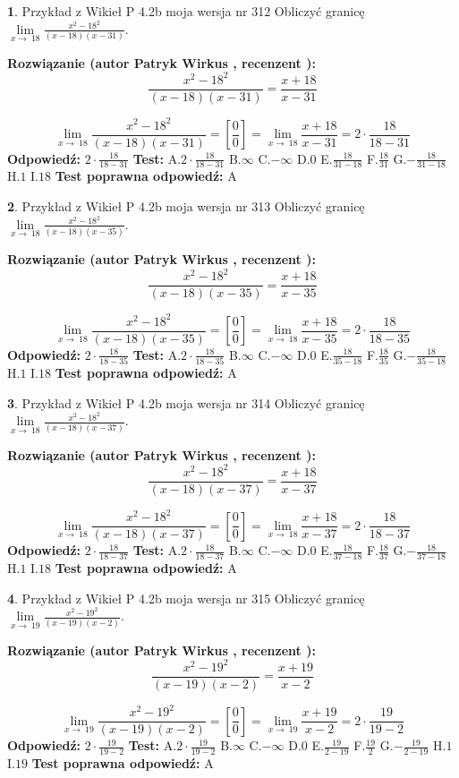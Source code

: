 \documentclass[12pt, a4paper]{article}
\theoremstyle{definition} %
\newtheorem{zad}{}
\newcommand{\zadStart}[1]{\begin{zad}#1\newline}
\newcommand{\zadStop}{\end{zad}}
\newcommand{\rozwStart}[2]{\noindent \textbf{Rozwiązanie (autor #1 , recenzent #2): }\newline}
\newcommand{\rozwStop}{\newline}
\newcommand{\odpStart}{\noindent \textbf{Odpowiedź:}\newline}
\newcommand{\odpStop}{\newline}
\newcommand{\testStart}{\noindent \textbf{Test:}\newline}
\newcommand{\testStop}{\newline}
\newcommand{\kluczStart}{\noindent \textbf{Test poprawna odpowiedź:}\newline}
\newcommand{\kluczStop}{\newline}
\begin{document}
\zadStart{Przykład z Wikieł P 4.2b moja wersja nr 312}
Obliczyć granicę $\lim\limits_{x\to\ 18}\frac{x^{2}-18^{2}}{(x-18)(x-31)}$.
\zadStop
\rozwStart{Patryk Wirkus}{}
$$\frac{x^{2}-18^{2}}{(x-18)(x-31)}=\frac{x+18}{x-31}$$

$$\lim\limits_{x\to\ 18}\frac{x^{2}-18^{2}}{(x-18)(x-31)}=[\frac{0}{0}]=\lim\limits_{x\to\ 18}\frac{x+18}{x-31}=2 \cdot \frac{18}{18-31}$$
\rozwStop
\odpStart
$2 \cdot \frac{18}{18-31}$
\odpStop
\testStart
A.$2 \cdot \frac{18}{18-31}$
B.$\infty$
C.$-\infty$
D.$0$
E.$\frac{18}{31-18}$
F.$\frac{18}{31}$
G.$-\frac{18}{31-18}$
H.$1$
I.$18$
\testStop
\kluczStart
A
\kluczStop



\zadStart{Przykład z Wikieł P 4.2b moja wersja nr 313}
Obliczyć granicę $\lim\limits_{x\to\ 18}\frac{x^{2}-18^{2}}{(x-18)(x-35)}$.
\zadStop
\rozwStart{Patryk Wirkus}{}
$$\frac{x^{2}-18^{2}}{(x-18)(x-35)}=\frac{x+18}{x-35}$$

$$\lim\limits_{x\to\ 18}\frac{x^{2}-18^{2}}{(x-18)(x-35)}=[\frac{0}{0}]=\lim\limits_{x\to\ 18}\frac{x+18}{x-35}=2 \cdot \frac{18}{18-35}$$
\rozwStop
\odpStart
$2 \cdot \frac{18}{18-35}$
\odpStop
\testStart
A.$2 \cdot \frac{18}{18-35}$
B.$\infty$
C.$-\infty$
D.$0$
E.$\frac{18}{35-18}$
F.$\frac{18}{35}$
G.$-\frac{18}{35-18}$
H.$1$
I.$18$
\testStop
\kluczStart
A
\kluczStop



\zadStart{Przykład z Wikieł P 4.2b moja wersja nr 314}
Obliczyć granicę $\lim\limits_{x\to\ 18}\frac{x^{2}-18^{2}}{(x-18)(x-37)}$.
\zadStop
\rozwStart{Patryk Wirkus}{}
$$\frac{x^{2}-18^{2}}{(x-18)(x-37)}=\frac{x+18}{x-37}$$

$$\lim\limits_{x\to\ 18}\frac{x^{2}-18^{2}}{(x-18)(x-37)}=[\frac{0}{0}]=\lim\limits_{x\to\ 18}\frac{x+18}{x-37}=2 \cdot \frac{18}{18-37}$$
\rozwStop
\odpStart
$2 \cdot \frac{18}{18-37}$
\odpStop
\testStart
A.$2 \cdot \frac{18}{18-37}$
B.$\infty$
C.$-\infty$
D.$0$
E.$\frac{18}{37-18}$
F.$\frac{18}{37}$
G.$-\frac{18}{37-18}$
H.$1$
I.$18$
\testStop
\kluczStart
A
\kluczStop



\zadStart{Przykład z Wikieł P 4.2b moja wersja nr 315}
Obliczyć granicę $\lim\limits_{x\to\ 19}\frac{x^{2}-19^{2}}{(x-19)(x-2)}$.
\zadStop
\rozwStart{Patryk Wirkus}{}
$$\frac{x^{2}-19^{2}}{(x-19)(x-2)}=\frac{x+19}{x-2}$$

$$\lim\limits_{x\to\ 19}\frac{x^{2}-19^{2}}{(x-19)(x-2)}=[\frac{0}{0}]=\lim\limits_{x\to\ 19}\frac{x+19}{x-2}=2 \cdot \frac{19}{19-2}$$
\rozwStop
\odpStart
$2 \cdot \frac{19}{19-2}$
\odpStop
\testStart
A.$2 \cdot \frac{19}{19-2}$
B.$\infty$
C.$-\infty$
D.$0$
E.$\frac{19}{2-19}$
F.$\frac{19}{2}$
G.$-\frac{19}{2-19}$
H.$1$
I.$19$
\testStop
\kluczStart
A
\kluczStop
\end{document}
